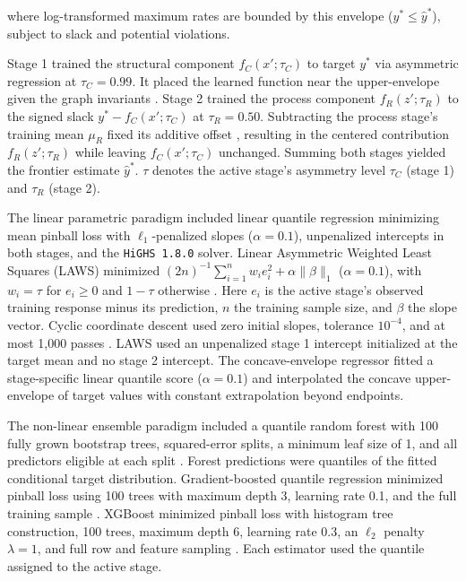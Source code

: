 \documentclass{article}
\begin{document}
where log-transformed maximum rates are bounded by this envelope ($y^* \leq \widehat{y}^*$), subject to slack and potential violations.
\clearpage

Stage 1 trained the structural component $f_C(x'; \tau_C)$ to target $y^{*}$ via asymmetric regression at $\tau_C = 0.99$. It placed the learned function near the upper-envelope given the graph invariants \citep{ref29}. Stage 2 trained the process component $f_R(z'; \tau_R)$ to the signed slack $y^{*} - f_C(x'; \tau_C)$ at $\tau_R = 0.50$. Subtracting the process stage's training mean $\mu_R$ fixed its additive offset \citep{ref67}, resulting in the centered contribution $f_R(z'; \tau_R)$ while leaving $f_C(x'; \tau_C)$ unchanged. Summing both stages yielded the frontier estimate $\widehat{y}^*$. $\tau$ denotes the active stage's asymmetry level $\tau_C$ (stage 1) and $\tau_R$ (stage 2).

The linear parametric paradigm included linear quantile regression \citep{ref22} minimizing mean pinball loss with $\ell_1$-penalized slopes ($\alpha = 0.1$), unpenalized intercepts in both stages, and the \texttt{HiGHS 1.8.0} solver. Linear Asymmetric Weighted Least Squares (LAWS) minimized $(2n)^{-1}\sum_{i=1}^{n} w_i e_i^2 + \alpha\lVert\beta\rVert_1$ ($\alpha = 0.1$), with $w_i = \tau$ for $e_i \ge 0$ and $1-\tau$ otherwise \citep{ref36}. Here $e_i$ is the active stage's observed training response minus its prediction, $n$ the training sample size, and $\beta$ the slope vector. Cyclic coordinate descent used zero initial slopes, tolerance $10^{-4}$, and at most 1,000 passes \citep{ref76}. LAWS used an unpenalized stage 1 intercept initialized at the target mean and no stage 2 intercept. The concave-envelope regressor fitted a stage-specific linear quantile score ($\alpha = 0.1$) and interpolated the concave upper-envelope of target values with constant extrapolation beyond endpoints.

The non-linear ensemble paradigm included a quantile random forest with 100 fully grown bootstrap trees, squared-error splits, a minimum leaf size of 1, and all predictors eligible at each split \citep{ref37}. Forest predictions were quantiles of the fitted conditional target distribution. Gradient-boosted quantile regression minimized pinball loss using 100 trees with maximum depth 3, learning rate 0.1, and the full training sample \citep{ref38}. XGBoost minimized pinball loss with histogram tree construction, 100 trees, maximum depth 6, learning rate 0.3, an $\ell_2$ penalty $\lambda = 1$, and full row and feature sampling \citep{ref39}. Each estimator used the quantile assigned to the active stage.
\end{document}
